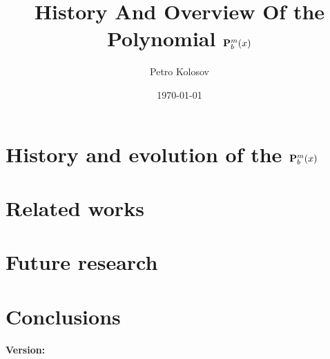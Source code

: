 \documentclass[12pt,letterpaper,oneside,reqno]{amsart}
\title[History And Overview Of the Polynomial \texorpdfstring{$\polynomialP{m}{b}{x}$}{P[m,b,x]}]
{History And Overview Of the Polynomial \texorpdfstring{$\polynomialP{m}{b}{x}$}{P[m,b,x]}}
\author[Petro Kolosov]{Petro Kolosov}
\date{\today}
\newcommand \polynomialP [4][P]{{\mathbf{#1}}\sp{#2} \sb{#3}(#4)}
\numberwithin{equation}{section}
\begin{document}
    \begin{abstract}
        
    \end{abstract}

    \maketitle

    \tableofcontents


    \section{History and evolution of the \texorpdfstring{$\polynomialP{m}{b}{x}$}{P[m,b,x]}}
    \label{sec:history-and-evolution-of-the-topic}
    


    \section{Related works}\label{sec:related-works}
    


    \section{Future research}\label{sec:future-research}
    


    \section{Conclusions}\label{sec:conclusions}
    

    
    
    \noindent \textbf{Version:} 
\end{document}
